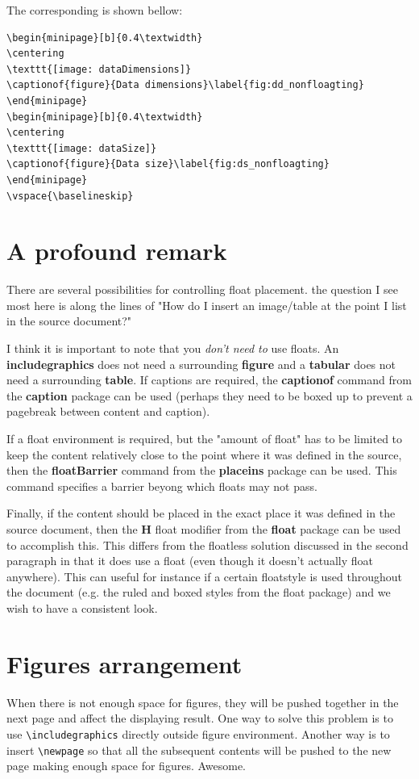 The corresponding is shown bellow:
\begin{lstlisting}[language={[LaTeX]TeX}]
\begin{minipage}[b]{0.4\textwidth}
\centering
\texttt{[image: dataDimensions]}
\captionof{figure}{Data dimensions}\label{fig:dd_nonfloagting}
\end{minipage}
\begin{minipage}[b]{0.4\textwidth}
\centering
\texttt{[image: dataSize]}
\captionof{figure}{Data size}\label{fig:ds_nonfloagting}
\end{minipage}
\vspace{\baselineskip}
\end{lstlisting}

\section{A profound remark}
There are several possibilities for controlling float placement. the question I see most here is along the lines of "How do I insert an image/table at the point I list in the source document?"

I think it is important to note that you \emph{don't need to} use floats. An \textbf{includegraphics} does not need a surrounding \textbf{figure} and a \textbf{tabular} does not need a surrounding \textbf{table}. If captions are required, the \textbf{captionof} command from the \textbf{caption} package can be used (perhaps they need to be boxed up to prevent a pagebreak between content and caption).

If a float environment is required, but the "amount of float" has to be limited to keep the content relatively close to the point where it was defined in the source, then the \textbf{floatBarrier} command from the \textbf{placeins} package can be used. This command specifies a barrier beyong which floats may not pass.

Finally, if the content should be placed in the exact place it was defined in the source document, then the \textbf{H} float modifier from the \textbf{float} package can be used to accomplish this. This differs from the floatless solution discussed in the second paragraph in that it does use a float (even though it doesn't actually float anywhere). This can useful for instance if a certain floatstyle is used throughout the document (e.g. the ruled and boxed styles from the float package) and we wish to have a consistent look.

\section{Figures arrangement}
When there is not enough space for figures, they will be pushed together in the next page and affect the displaying result. One way to solve this problem is to use \lstinline[language = {[LaTeX]TeX}]|\includegraphics| directly outside figure environment. Another way is to insert \lstinline[language = {[LaTeX]TeX}]|\newpage| so that all the subsequent contents will be pushed to the new page making enough space for figures. Awesome.

